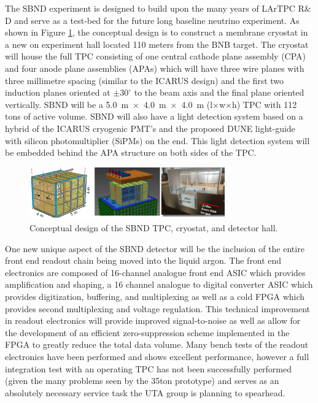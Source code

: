 
The SBND experiment is designed to build upon the many years of LArTPC R$\&$D and serve as a test-bed for the future long baseline neutrino experiment. As shown in Figure \ref{fig:sbnd}, the conceptual design is to construct a membrane cryostat in a new on experiment hall located 110 meters from the BNB target. The cryostat will house the full TPC consisting of one central cathode plane assembly (CPA) and four anode plane assemblies (APAs) which will have three wire planes with three millimetre spacing (similar to the ICARUS design) and the first two induction planes oriented at $\pm 30^{\circ}$ to the beam axis and the final plane oriented vertically. SBND will be a 5.0~m~$\times$~4.0~m~$\times$~4.0~m (l$\times$w$\times$h) TPC with 112 tons of active volume. SBND will also have a light detection system based on a hybrid of the ICARUS cryogenic PMT's and the proposed DUNE light-guide with silicon photomultiplier (SiPMs) on the end. This light detection system will be embedded behind the APA structure on both sides of the TPC. 

\begin{figure}[htb]
\centering
\includegraphics[width=0.75\textwidth]{images/sbnd.png}
\caption[]{Conceptual design of the SBND TPC, cryostat, and detector hall.}
\label{fig:sbnd}
\end{figure}

One new unique aspect of the SBND detector will be the inclusion of the entire front end readout chain being moved into the liquid argon. The front end electronics are composed of 16-channel analogue front end ASIC which provides amplification and shaping, a 16 channel analogue to digital converter ASIC which provides digitization, buffering, and multiplexing as well as a cold FPGA which provides second multiplexing and voltage regulation. This technical improvement in readout electronics will provide improved signal-to-noise as well as allow for the development of an efficient zero-suppression scheme implemented in the FPGA to greatly reduce the total data volume. Many bench tests of the readout electronics have been performed and shows excellent performance, however a full integration test with an operating TPC has not been successfully performed (given the many problems seen by the 35ton prototype) and serves as an absolutely necessary service task the UTA group is planning to spearhead. 

